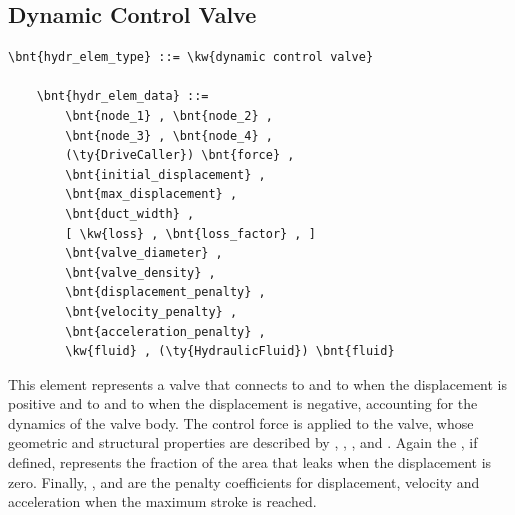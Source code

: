 \subsection{Dynamic Control Valve}
\label{sec:EL:HYDR:DYNAMIC_CONTROL_VALVE}
\begin{Verbatim}[commandchars=\\\{\}]
    \bnt{hydr_elem_type} ::= \kw{dynamic control valve}

    \bnt{hydr_elem_data} ::=
        \bnt{node_1} , \bnt{node_2} ,
        \bnt{node_3} , \bnt{node_4} ,
        (\ty{DriveCaller}) \bnt{force} ,
        \bnt{initial_displacement} ,
        \bnt{max_displacement} ,
        \bnt{duct_width} ,
        [ \kw{loss} , \bnt{loss_factor} , ]
        \bnt{valve_diameter} ,
        \bnt{valve_density} ,
        \bnt{displacement_penalty} ,
        \bnt{velocity_penalty} ,
        \bnt{acceleration_penalty} ,
        \kw{fluid} , (\ty{HydraulicFluid}) \bnt{fluid}
\end{Verbatim}
This element represents a valve that connects
 to  and  to 
when the displacement is positive and  to 
and  to  when the displacement is negative,
accounting for the dynamics of the valve body.
The control force  is applied to the valve, whose 
geometric and structural properties are described by 
, ,
,  and .
Again the , if defined, represents the fraction
of the area that leaks when the displacement is zero.
Finally, ,  and 
are the penalty coefficients for displacement, velocity and acceleration
when the maximum stroke is reached.




